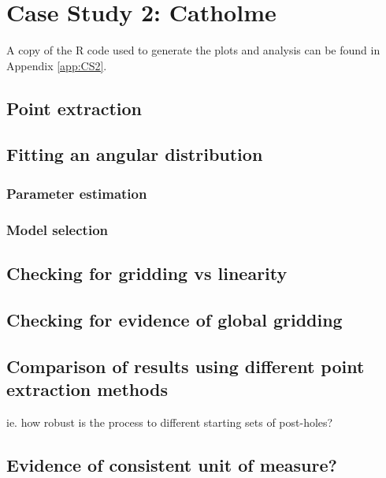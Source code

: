 \documentclass[../../ArchStats.tex]{subfiles}
\begin{document}
\section{Case Study 2: Catholme}
\label{sec:CS2}

A copy of the R code used to generate the plots and analysis can be found in Appendix \ref{app:CS2}.

\subsection{Point extraction}

\subsection{Fitting an angular distribution}

\subsubsection{Parameter estimation}
\subsubsection{Model selection}

\subsection{Checking for gridding vs linearity}

\subsection{Checking for evidence of global gridding}

\subsection{Comparison of results using different point extraction methods}
ie. how robust is the process to different starting sets of post-holes?

\subsection{Evidence of consistent unit of measure?}
\end{document}
